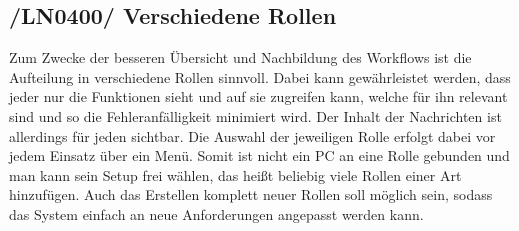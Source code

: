 \subsection{/LN0400/ Verschiedene Rollen}
Zum Zwecke der besseren Übersicht und Nachbildung des Workflows ist die Aufteilung in verschiedene Rollen sinnvoll.  
Dabei kann gewährleistet werden, dass jeder nur die Funktionen sieht und auf sie zugreifen kann, welche für ihn relevant sind und so die Fehleranfälligkeit minimiert wird. Der Inhalt der Nachrichten ist allerdings für jeden sichtbar.
Die Auswahl der jeweiligen Rolle erfolgt dabei vor jedem Einsatz über ein Menü. Somit ist nicht ein PC an eine Rolle gebunden und man kann sein Setup frei wählen, das heißt beliebig viele Rollen einer Art hinzufügen.
Auch das Erstellen komplett neuer Rollen soll möglich sein, sodass das System einfach an neue Anforderungen angepasst werden kann. 
